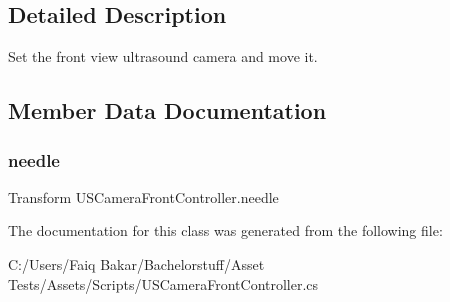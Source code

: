 \subsection{Detailed Description}
Set the front view ultrasound camera and move it. 

\subsection{Member Data Documentation}
\mbox{\label{class_u_s_camera_front_controller_a699d102b264fb7b8e576c5f4b19a036f}} 
\subsubsection{\texorpdfstring{needle}{needle}}
{\footnotesize\ttfamily Transform U\+S\+Camera\+Front\+Controller.\+needle}







The documentation for this class was generated from the following file\+:\begin{DoxyCompactItemize}
\item 
C\+:/\+Users/\+Faiq Bakar/\+Bachelorstuff/\+Asset Tests/\+Assets/\+Scripts/U\+S\+Camera\+Front\+Controller.\+cs\end{DoxyCompactItemize}
